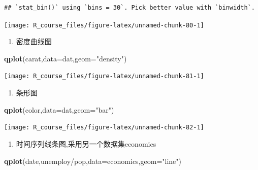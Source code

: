 \documentclass[]{article}
\newenvironment{Shaded}{\begin{snugshade}}{\end{snugshade}}
\newcommand{\KeywordTok}[1]{\textcolor[rgb]{0.13,0.29,0.53}{\textbf{{#1}}}}
\newcommand{\DataTypeTok}[1]{\textcolor[rgb]{0.13,0.29,0.53}{{#1}}}
\newcommand{\StringTok}[1]{\textcolor[rgb]{0.31,0.60,0.02}{{#1}}}
\newcommand{\NormalTok}[1]{{#1}}
\providecommand{\tightlist}{%
  \setlength{\itemsep}{0pt}\setlength{\parskip}{0pt}}
\numberwithin{figure}{section}
\numberwithin{table}{section}
\theoremstyle{definition}
\theoremstyle{definition}
\theoremstyle{definition}
\theoremstyle{remark}
\begin{document}
\begin{verbatim}
## `stat_bin()` using `bins = 30`. Pick better value with `binwidth`.
\end{verbatim}

\begin{center}\texttt{[image: R\_course\_files/figure-latex/unnamed-chunk-80-1]} \end{center}

\begin{enumerate}
\def\labelenumi{\arabic{enumi}.}
\setcounter{enumi}{3}
\tightlist
\item
  密度曲线图
\end{enumerate}

\begin{Shaded}
\begin{Highlighting}[]
\KeywordTok{qplot}\NormalTok{(carat,}\DataTypeTok{data=}\NormalTok{dat,}\DataTypeTok{geom=}\StringTok{"density"}\NormalTok{)}
\end{Highlighting}
\end{Shaded}

\begin{center}\texttt{[image: R\_course\_files/figure-latex/unnamed-chunk-81-1]} \end{center}

\begin{enumerate}
\def\labelenumi{\arabic{enumi}.}
\setcounter{enumi}{4}
\tightlist
\item
  条形图
\end{enumerate}

\begin{Shaded}
\begin{Highlighting}[]
\KeywordTok{qplot}\NormalTok{(color,}\DataTypeTok{data=}\NormalTok{dat,}\DataTypeTok{geom=}\StringTok{"bar"}\NormalTok{)}
\end{Highlighting}
\end{Shaded}

\begin{center}\texttt{[image: R\_course\_files/figure-latex/unnamed-chunk-82-1]} \end{center}

\begin{enumerate}
\def\labelenumi{\arabic{enumi}.}
\setcounter{enumi}{5}
\tightlist
\item
  时间序列线条图,采用另一个数据集economics
\end{enumerate}

\begin{Shaded}
\begin{Highlighting}[]
\KeywordTok{qplot}\NormalTok{(date,unemploy/pop,}\DataTypeTok{data=}\NormalTok{economics,}\DataTypeTok{geom=}\StringTok{"line"}\NormalTok{)}
\end{Highlighting}
\end{Shaded}
\end{document}
